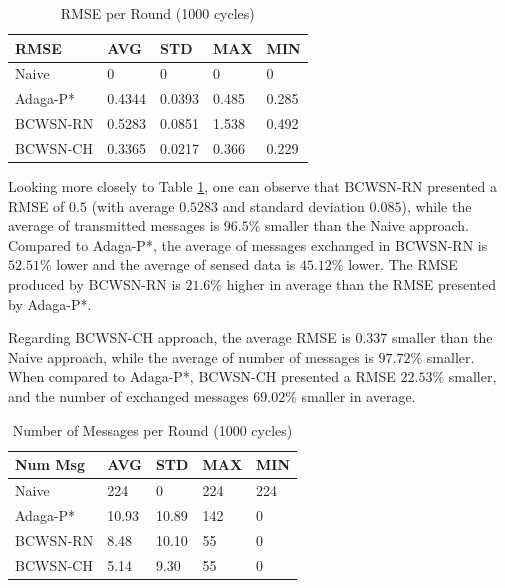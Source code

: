 \documentclass[conference]{IEEEtran}
\begin{document}
\begin{table}[h!]
\caption{RMSE per Round (1000 cycles)}
\label{tab:rmse}
\begin{center}
\begin{tabular}{|l||l|l|l|l|}
\hline
RMSE &AVG &STD &MAX &MIN \\
\hline\hline
Naive &0 &0 &0 &0 \\
\hline
Adaga-P* &0.4344 &0.0393 &0.485 &0.285 \\
\hline
BCWSN-RN &0.5283 &0.0851 &1.538 &0.492 \\
\hline
BCWSN-CH &0.3365 &0.0217 &0.366 &0.229 \\
\hline
\end{tabular}
\end{center}
\end{table}

Looking more closely to Table \ref{tab:rmse}, one can observe that BCWSN-RN
presented a RMSE of $0.5$ (with average $0.5283$ and standard deviation $0.085$),
while the average of transmitted messages  is $96.5\%$ smaller than the Naive
approach. Compared to Adaga-P*, the average of messages exchanged in BCWSN-RN is
 $52.51\%$ lower and the average of sensed data is $45.12\%$ lower. The RMSE
produced by BCWSN-RN is $21.6\%$ higher in average than the RMSE presented by
Adaga-P*.


Regarding BCWSN-CH approach, the average RMSE is $0.337$ smaller than the Naive
approach, while the average of number of messages is $97.72\%$ smaller. When
compared to Adaga-P*, BCWSN-CH presented a RMSE $22.53\%$ smaller, and the
number of exchanged messages $69.02\%$ smaller in average.

\begin{table}[h!]
\caption{Number of Messages per Round (1000 cycles)}
\label{tab:num-msg}
\begin{center}
\begin{tabular}{|l||l|l|l|l|}
\hline
Num Msg &AVG &STD &MAX &MIN \\
\hline\hline
Naive &224 &0 &224 &224 \\
\hline
Adaga-P* &10.93 &10.89 &142 &0 \\
\hline
BCWSN-RN &8.48 &10.10 &55 &0 \\
\hline
BCWSN-CH &5.14 &9.30 &55 &0 \\
\hline
\end{tabular}
\end{center}
\end{table}
\end{document}
